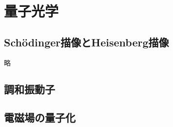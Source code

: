 \documentclass{report}
\begin{document}
  \chapter{量子光学}
    \section{Sch\"odinger描像とHeisenberg描像}
      略
    \section{調和振動子}
      
    \section{電磁場の量子化}
\end{document}

